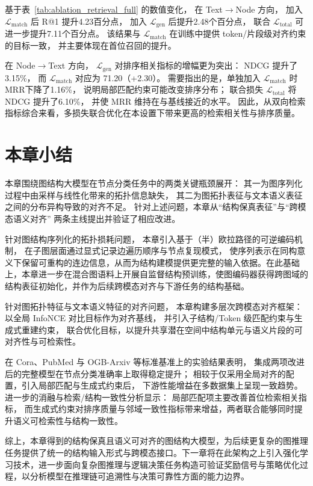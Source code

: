 基于表~\ref{tab:ablation_retrieval_full} 的数值变化，
在 Text$\rightarrow$Node 方向，
加入 $\mathcal{L}_{\mathrm{match}}$ 后 R@1 提升4.23百分点，
加入 $\mathcal{L}_{\mathrm{gen}}$ 后提升2.48个百分点，
联合 $\mathcal{L}_{\mathrm{total}}$ 可进一步提升7.11个百分点。
该结果与 $\mathcal{L}_{\mathrm{match}}$ 在训练中提供 token/片段级对齐约束的目标一致，
并主要体现在首位召回的提升。

在 Node$\rightarrow$Text 方向，
$\mathcal{L}_{\mathrm{gen}}$ 对排序相关指标的增幅更为突出：
NDCG 提升了3.15\%，
而 $\mathcal{L}_{\mathrm{match}}$ 对应为 71.20（+2.30）。
需要指出的是，单独加入 $\mathcal{L}_{\mathrm{match}}$ 时 MRR下降了1.16\%，
说明局部匹配约束可能改变排序分布；
联合损失 $\mathcal{L}_{\mathrm{total}}$ 将 NDCG 提升了6.10\%，
并使 MRR 维持在与基线接近的水平。
因此，从双向检索指标综合来看，多损失联合优化在本设置下带来更高的检索相关性与排序质量。

\section{本章小结}
\label{sec:three_summerize}

本章围绕图结构大模型在节点分类任务中的两类关键瓶颈展开：
其一为图序列化过程中由采样与线性化带来的拓扑信息缺失，
其二为图拓扑表征与文本语义表征之间的分布异构导致的对齐不足。
针对上述问题，本章从“结构保真表征”与“跨模态语义对齐”
两条主线提出并验证了相应改进。

针对图结构序列化的拓扑损耗问题，
本章引入基于（半）欧拉路径的可逆编码机制，
在子图层面通过显式记录边遍历顺序与节点复现模式，
使序列表示在同构意义下保留可重构的连边信息，从而为结构建模提供更完整的输入依据。在此基础上，本章进一步在混合图语料上开展自监督结构预训练，使图编码器获得跨图域的结构表征初始化，并作为后续跨模态对齐与下游任务的结构基础。

针对图拓扑特征与文本语义特征的对齐问题，
本章构建多层次跨模态对齐框架：
以全局 InfoNCE 对比目标作为对齐基线，
并引入子结构/Token 级匹配约束与生成式重建约束，
联合优化目标，以提升共享潜在空间中结构单元与语义片段的可对齐性与可检索性。

在 Cora、PubMed 与 OGB-Arxiv 等标准基准上的实验结果表明，
集成两项改进后的完整模型在节点分类准确率上取得稳定提升；
相较于仅采用全局对齐的配置，引入局部匹配与生成式约束后，
下游性能增益在多数据集上呈现一致趋势。
进一步的消融与检索/结构一致性分析显示：
局部匹配项主要改善首位检索相关指标，
而生成式约束对排序质量与邻域一致性指标带来增益，两者联合能够同时提升语义可检索性与结构一致性。

综上，本章得到的结构保真且语义可对齐的图结构大模型，为后续更复杂的图推理任务提供了统一的结构输入形式与跨模态接口。下一章将在此架构之上引入强化学习技术，进一步面向复杂图推理与逻辑决策任务构造可验证奖励信号与策略优化过程，以分析模型在推理链可追溯性与决策可靠性方面的能力边界。

